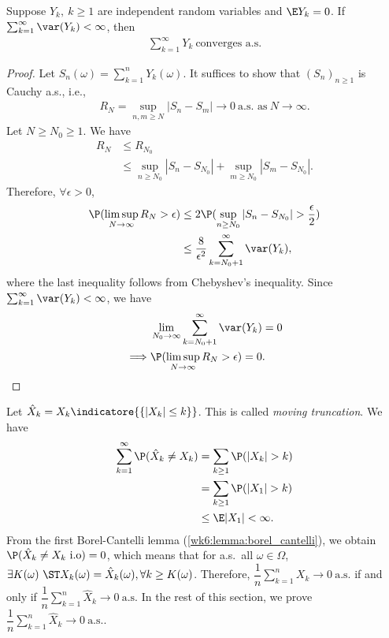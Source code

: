 \documentclass[../aipt.tex]{subfiles}
\begin{document}
\begin{Theorem} \label{wk7:thm:var_conv_criteria}
Suppose $Y_k,\ k \geq 1$ are independent random variables and $\E Y_k = 0$. If $\sum_{k=1}^{\infty} \var(Y_k) < \infty$, then
\begin{align*}
\sum_{k=1}^{\infty} Y_k \ \text{converges a.s.}
\end{align*}
\end{Theorem}
\begin{proof}
Let $S_n(\omega) = \sum_{k=1}^n Y_k(\omega)$. It suffices to show that $(S_n)_{n \geq 1}$ is Cauchy a.s., i.e.,
\begin{align*}
R_N = \sup_{n,m \geq N} |S_n - S_m| \to 0 \ \text{a.s. as} \ N \to \infty.
\end{align*}
Let $N \geq N_0 \geq 1$. We have
\begin{align*}
R_N 
&\leq R_{N_0} \\
&\leq \sup_{n \geq N_0} |S_n - S_{N_0}| + \sup_{m \geq N_0} |S_m - S_{N_0}|.
\end{align*}
Therefore, $\forall \epsilon > 0$,
\begin{align*}
\P(\limsup_{N \to \infty} R_N > \epsilon) 
&\leq 2 \P(\sup_{n \geq N_0} |S_n - S_{N_0}| > \frac{\epsilon}{2}) \\
&\leq \frac{8}{\epsilon^2} \sum_{k = N_0 +1}^{\infty} \var(Y_k),
\end{align*} 
where the last inequality follows from Chebyshev's inequality. Since $\sum_{k=1}^{\infty} \var(Y_k) < \infty$, we have
\begin{align*}
&\lim_{N_0 \to \infty}\sum_{k = N_0 +1}^{\infty} \var(Y_k) = 0 \\
\implies
&\P(\limsup_{N \to \infty} R_N > \epsilon) = 0.
\end{align*} 
\end{proof}

Let $\hat{X}_k = X_k \indicatore{\{|X_k| \leq k\}}$. This is called \emph{moving truncation}. We have
\begin{align*}
\sum_{k=1}^{\infty} \P(\hat{X}_k \neq X_k) 
&= \sum_{k \geq 1} \P(|X_k| > k) \\
&= \sum_{k \geq 1} \P(|X_1| > k) \\
&\leq \E |X_1| < \infty.
\end{align*} 
From the first Borel-Cantelli lemma (\cref{wk6:lemma:borel_cantelli}), we obtain $\P(\hat{X}_k \neq X_k \ \text{i.o}) = 0$, which means that for a.s.\ all $\omega \in \Omega$, $\exists K(\omega)\ \ST X_k(\omega) = \hat{X}_k(\omega), \forall k \geq K(\omega)$. Therefore, $\dfrac{1}{n} \sum_{k=1}^{n} X_k \to 0 \ \text{a.s.}$ if and only if $\dfrac{1}{n} \sum_{k=1}^{n} \hat{X}_k \to 0 \ \text{a.s.}$ In the rest of this section, we prove $\dfrac{1}{n} \sum_{k=1}^{n} \hat{X}_k \to 0 \ \text{a.s.}$.
\end{document}
